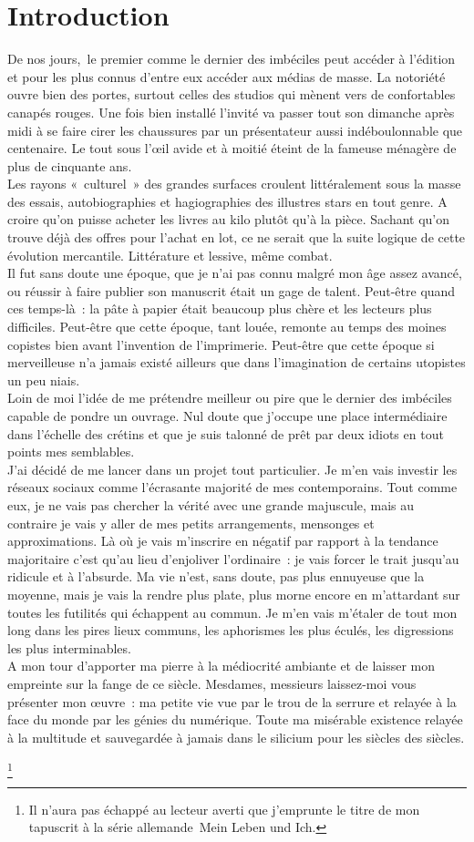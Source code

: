 ﻿\chapter*{Introduction}
De nos jours, le premier comme le dernier des imbéciles peut accéder à l’édition et pour les plus connus d’entre eux accéder aux médias de masse. La notoriété ouvre bien des portes, surtout celles des studios qui mènent vers de confortables canapés rouges. Une fois bien installé l’invité va passer tout son dimanche après midi à se faire cirer les chaussures par un présentateur aussi indéboulonnable que centenaire. Le tout sous l’œil avide et à moitié éteint de la fameuse ménagère de plus de cinquante ans. \\
Les rayons « culturel » des grandes surfaces croulent littéralement sous la masse des essais, autobiographies et hagiographies des illustres stars en tout genre. A croire qu’on puisse acheter les livres au kilo plutôt qu’à la pièce. Sachant qu’on trouve déjà des offres pour l’achat en lot, ce ne serait que la suite logique de cette évolution mercantile. Littérature et lessive, même combat. \\
Il fut sans doute une époque, que je n’ai pas connu malgré mon âge assez avancé, ou réussir à faire publier son manuscrit était un gage de talent. Peut-être quand ces temps-là : la pâte à papier était beaucoup plus chère et les lecteurs plus difficiles. Peut-être que cette époque, tant louée, remonte au temps des moines copistes bien avant l’invention de l’imprimerie. Peut-être que cette époque si merveilleuse n’a jamais existé ailleurs que dans l’imagination de certains utopistes un peu niais.\\

Loin de moi l’idée de me prétendre meilleur ou pire que le dernier des imbéciles capable de pondre un ouvrage. Nul doute que j’occupe une place intermédiaire dans l’échelle des crétins et que je suis talonné de prêt par deux idiots en tout points mes semblables. \\

J’ai décidé de me lancer dans un projet tout particulier. Je m’en vais investir les réseaux sociaux comme l’écrasante majorité de mes contemporains. Tout comme eux, je ne vais pas chercher la vérité avec une grande majuscule, mais au contraire je vais y aller de mes petits arrangements, mensonges et approximations. Là où je vais m’inscrire en négatif par rapport à la tendance majoritaire c’est qu’au lieu d’enjoliver l’ordinaire : je vais forcer le trait jusqu’au ridicule et à l’absurde. Ma vie n’est, sans doute, pas plus ennuyeuse que la moyenne, mais je vais la rendre plus plate, plus morne encore en m’attardant sur toutes les futilités qui échappent au commun. Je m’en vais m’étaler de tout mon long dans les pires lieux communs, les aphorismes les plus éculés, les digressions les plus interminables. \\
A mon tour d’apporter ma pierre à la médiocrité ambiante et de laisser mon empreinte sur la fange de ce siècle. Mesdames, messieurs laissez-moi vous présenter mon œuvre : ma petite vie vue par le trou de la serrure et relayée à la face du monde par les génies du numérique. Toute ma misérable existence relayée à la multitude et sauvegardée à jamais dans le silicium pour les siècles des siècles. 

\footnote{Il n’aura pas échappé au lecteur averti que j’emprunte le titre de mon tapuscrit à la série allemande Mein Leben und Ich.}
